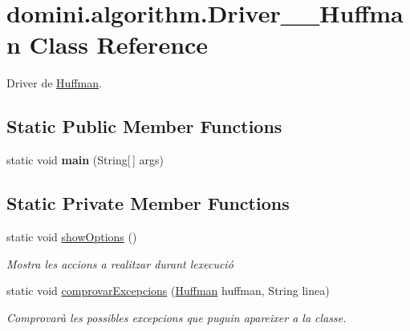 \hypertarget{classdomini_1_1algorithm_1_1Driver____Huffman}{}\section{domini.\+algorithm.\+Driver\+\_\+\+\_\+\+Huffman Class Reference}
\label{classdomini_1_1algorithm_1_1Driver____Huffman}


Driver de \hyperlink{classdomini_1_1algorithm_1_1Huffman}{Huffman}.  


\subsection*{Static Public Member Functions}
\begin{DoxyCompactItemize}
\item 
\mbox{\label{classdomini_1_1algorithm_1_1Driver____Huffman_a2fe727dd4ebafefce42bdc94f5dd80fe}} 
static void {\bfseries main} (String\mbox{[}$\,$\mbox{]} args)
\end{DoxyCompactItemize}
\subsection*{Static Private Member Functions}
\begin{DoxyCompactItemize}
\item 
\mbox{\label{classdomini_1_1algorithm_1_1Driver____Huffman_a0504e4a97aa7c7a0ad7c1a75187adb10}} 
static void \hyperlink{classdomini_1_1algorithm_1_1Driver____Huffman_a0504e4a97aa7c7a0ad7c1a75187adb10}{show\+Options} ()
\begin{DoxyCompactList}\small\item\em Mostra les accions a realitzar durant l\textquotesingle{}execució \end{DoxyCompactList}\item 
static void \hyperlink{classdomini_1_1algorithm_1_1Driver____Huffman_a5d56f18f1d8f96dfc735b9a127094319}{comprovar\+Excepcions} (\hyperlink{classdomini_1_1algorithm_1_1Huffman}{Huffman} huffman, String linea)
\begin{DoxyCompactList}\small\item\em Comprovarà les possibles excepcions que puguin apareixer a la classe. \end{DoxyCompactList}\end{DoxyCompactItemize}



